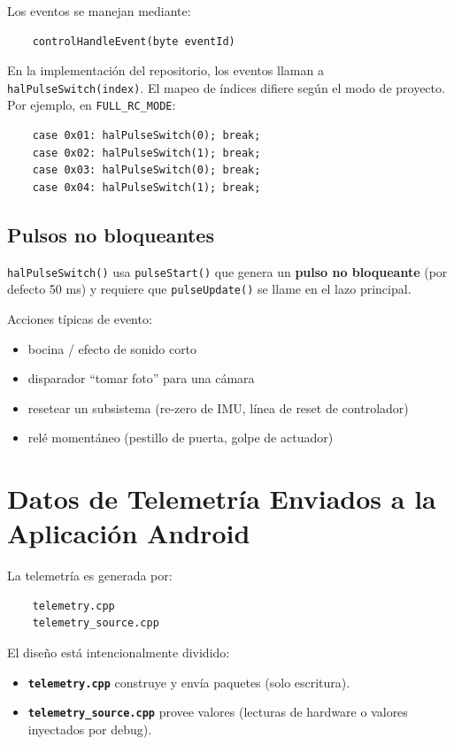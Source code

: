 Los eventos se manejan mediante:

\begin{verbatim}
    controlHandleEvent(byte eventId)
\end{verbatim}

En la implementación del repositorio, los eventos llaman a \texttt{halPulseSwitch(index)}. El mapeo de índices difiere
según el modo de proyecto. Por ejemplo, en \texttt{FULL\_RC\_MODE}:

\begin{verbatim}
    case 0x01: halPulseSwitch(0); break;
    case 0x02: halPulseSwitch(1); break;
    case 0x03: halPulseSwitch(0); break;
    case 0x04: halPulseSwitch(1); break;
\end{verbatim}

\subsection{Pulsos no bloqueantes}
\texttt{halPulseSwitch()} usa \texttt{pulseStart()} que genera un \textbf{pulso no bloqueante}
(por defecto 50 ms) y requiere que \texttt{pulseUpdate()} se llame en el lazo principal.

\noindent Acciones típicas de evento:
\begin{itemize}
    \item bocina / efecto de sonido corto
    \item disparador ``tomar foto'' para una cámara
    \item resetear un subsistema (re-zero de IMU, línea de reset de controlador)
    \item relé momentáneo (pestillo de puerta, golpe de actuador)
\end{itemize}

\section{Datos de Telemetría Enviados a la Aplicación Android}
\label{sec:telemetry-data}

La telemetría es generada por:

\begin{verbatim}
    telemetry.cpp
    telemetry_source.cpp
\end{verbatim}

El diseño está intencionalmente dividido:
\begin{itemize}
    \item \textbf{\texttt{telemetry.cpp}} construye y envía paquetes (solo escritura).
    \item \textbf{\texttt{telemetry\_source.cpp}} provee valores (lecturas de hardware o valores inyectados por debug).
\end{itemize}

